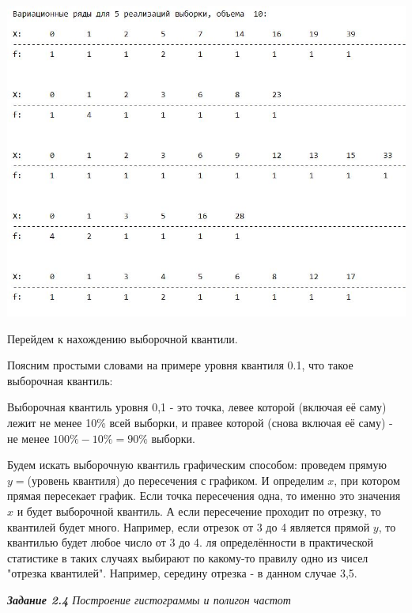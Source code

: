 \documentclass[a4paper,12pt, oneside]{book}
\begin{document}
	\begin{center}
		\begin{minipage}[h]{0.4\linewidth}
			\includegraphics[width=1.5\linewidth]{var_ser_10.jpg}

		\end{minipage}
	\end{center}


	Перейдем к нахождению выборочной квантили.
	
	Поясним простыми словами на примере уровня квантиля  0.1, что такое выборочная квантиль:
	
	\vspace{3mm}
	Выборочная квантиль уровня 0,1 - это точка, левее которой (включая её саму) лежит не менее 10\% всей выборки, и правее которой (снова включая её саму) - не менее $100\%-10\%=90\%$ выборки.
	\vspace{5mm}
	
	 Будем искать выборочную квантиль графическим способом: проведем прямую $y =$(уровень квантиля) до пересечения с графиком. И определим  $x$, при котором прямая пересекает график. Если точка пересечения одна, то именно это значения $x$ и будет выборочной квантиль. А если пересечение проходит по отрезку, то квантилей будет много. Например, если отрезок от 3 до 4 является прямой $y$, то квантилью будет любое число от 3 до 4. ля определённости в практической статистике в таких случаях выбирают по какому-то правилу одно из чисел "отрезка квантилей". Например, середину отрезка - в данном случае 3,5.

\newpage
{\large\textit{\textbf{Задание 2.4} Построение гистограммы и полигон частот}}
\end{document}
